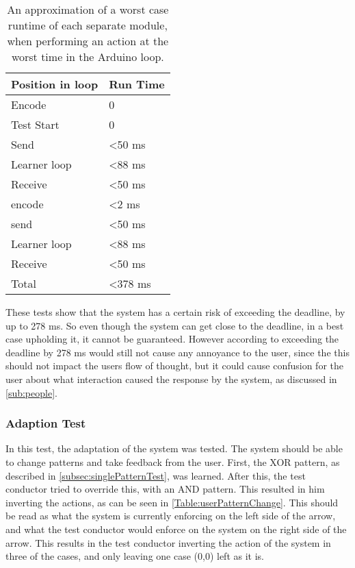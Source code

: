 \begin{table}[htbp]
  \centering
  \begin{tabular}{l l}
	\toprule
	Position in loop		& Run Time  \\ \midrule
	Encode 			        & 0  	  	\\ \midrule
	Test Start		        & 0  		\\ \midrule
	Send   			        & <50 ms     \\ \midrule
	Learner loop 	        & <88 ms     \\ \midrule
	Receive 		        & <50 ms     \\ \midrule
	encode 			        & <2 ms      \\ \midrule
	send   			        & <50 ms     \\ \midrule
	Learner loop 	        & <88 ms	    \\ \midrule
	Receive 		        & <50 ms     \\ \midrule \midrule
	Total			        & <378 ms     \\
                                          \bottomrule
  \end{tabular}
  \caption{An approximation of a worst case runtime of each separate module, when performing an action at the worst time in the Arduino loop.}\label{Table:WorstRunTimeAprox}
\end{table}

These tests show that the system has a certain risk of exceeding the deadline, by up to 278 ms. So even though the system can get close to the deadline, in a best case upholding it, it cannot be guaranteed. However according to \cite{jakobnielsen} exceeding the deadline by 278 ms would still not cause any annoyance to the user, since the this should not impact the users flow of thought, but it could cause confusion for the user about what interaction caused the response by the system, as discussed in \cref{sub:people}.

\subsubsection{Adaption Test}
In this test, the adaptation of the system was tested. The system should be able to change patterns and take feedback from the user. First, the XOR pattern, as described in \cref{subsec:singlePatternTest}, was learned. After this, the test conductor tried to override this, with an AND pattern. This resulted in him inverting the actions, as can be seen in \cref{Table:userPatternChange}. This should be read as what the system is currently enforcing on the left side of the arrow, and what the test conductor would enforce on the system on the right side of the arrow. This results in the test conductor inverting the action of the system in three of the cases, and only leaving one case (0,0) left as it is.

